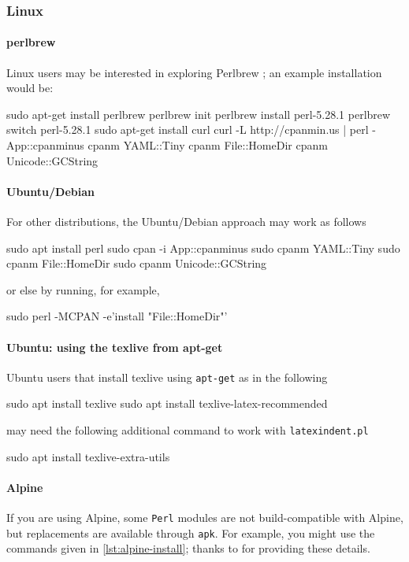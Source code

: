 	\subsubsection{Linux}
		\paragraph{perlbrew}
			Linux users may be interested in exploring Perlbrew \cite{perlbrew}; an example
			installation would be:
			\begin{commandshell}
sudo apt-get install perlbrew
perlbrew init
perlbrew install perl-5.28.1
perlbrew switch perl-5.28.1
sudo apt-get install curl
curl -L http://cpanmin.us | perl - App::cpanminus
cpanm YAML::Tiny
cpanm File::HomeDir
cpanm Unicode::GCString
\end{commandshell}

		\paragraph{Ubuntu/Debian}
			For other distributions, the Ubuntu/Debian approach may work as follows
			\begin{commandshell}
sudo apt install perl
sudo cpan -i App::cpanminus
sudo cpanm YAML::Tiny
sudo cpanm File::HomeDir
sudo cpanm Unicode::GCString
\end{commandshell}
			or else by running, for example,
			\begin{commandshell}
sudo perl -MCPAN -e'install "File::HomeDir"'
\end{commandshell}

		\paragraph{Ubuntu: using the texlive from apt-get}
			Ubuntu users that install texlive using \texttt{apt-get} as in the following
			\begin{commandshell}
sudo apt install texlive
sudo apt install texlive-latex-recommended
\end{commandshell}
			may need the following additional command to work with \texttt{latexindent.pl}
			\begin{commandshell}
sudo apt install texlive-extra-utils 
\end{commandshell}

		\paragraph{Alpine}
			If you are using Alpine, some \texttt{Perl} modules are not build-compatible with Alpine,
			but replacements are available through \texttt{apk}. For example, you might use the
			commands given in \cref{lst:alpine-install}; thanks to \cite{jun-sheaf} for providing
			these details.

